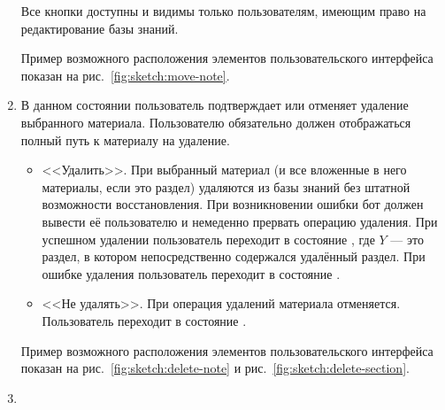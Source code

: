 \begin{enumerate}
            Все кнопки доступны и видимы только пользователям, имеющим право на редактирование базы
            знаний.

            Пример возможного расположения элементов пользовательского интерфейса показан на
            рис.~\ref{fig:sketch:move-note}.


        \item \label{itm:req:ui:states:delete-kbo}

            В данном состоянии пользователь подтверждает или отменяет удаление выбранного
            материала. Пользователю обязательно должен отображаться полный путь к материалу
            на удаление.
            \begin{itemize}
                \item
                    <<Удалить>>.
                    При  выбранный материал (и все вложенные в него материалы,
                    если это раздел) удаляются из базы знаний без штатной возможности восстановления.
                    При возникновении ошибки бот должен вывести её пользователю и немеденно прервать
                    операцию удаления.
                    При успешном удалении пользователь переходит в состояние
                    \hyperref[itm:req:ui:states:navx]
                    {},
                    где \(Y\) --- это раздел, в котором непосредственно содержался удалённый раздел.
                    При ошибке удаления пользователь переходит в состояние
                    \hyperref[itm:req:ui:states:navx]
                    {}.
                \item
                    <<Не удалять>>.
                    При  операция удалений материала отменяется.
                    Пользователь переходит в состояние
                    \hyperref[itm:req:ui:states:navx]
                    {}.
            \end{itemize}

            Пример возможного расположения элементов пользовательского интерфейса показан на
            рис.~\ref{fig:sketch:delete-note} и рис.~\ref{fig:sketch:delete-section}.

        \item \label{itm:req:ui:states:create-note}


\end{enumerate}
